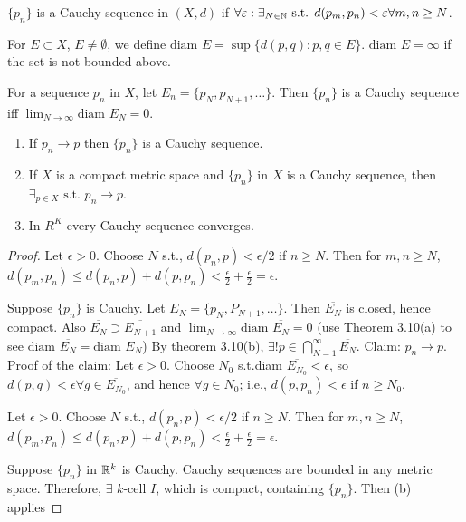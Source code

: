 \begin{definition}
	$\{p_n\}$ is a Cauchy sequence in $(X,d)$ if $\forall{\varepsilon}: \exists_{N \in \mathbb{N}} \text{ s.t. } d(p_{m},p_{n})<\varepsilon \forall m,n\ge N$.
\end{definition}
\begin{definition}
	\label{def:3.9}
	For $E \subset X$, $E \neq \emptyset$, we define $\text{diam } E=\sup{\{d(p,q): p,q \in E\}}$. $\text{diam } E=\infty$ if the set is not bounded above.
	\begin{example}
		For a sequence ${p_{n}}$ in $X$, let $E_{n}=\{p_N,p_{N+1},\ldots \}$. Then $\{p_{n}\}$ is a Cauchy sequence iff $\lim_{N\to \infty }{\text{diam }E_N}=0$.
	\end{example}

\end{definition}
\begin{thm}[11]
	\begin{enumerate}
		\item
		      \label{thm:3.11a}
		      If $p_{n}\to p$ then $\{p_{n}\} $ is a Cauchy sequence.
		\item If $X$ is a compact metric space and $\{p_{n}\}$ in $X$ is a Cauchy sequence, then $\exists_{p \in  X} \text{ s.t. } p_{n}\to p$.
		\item In $R^{K}$ every Cauchy sequence converges.
	\end{enumerate}
	\hfill
	\begin{proof}
		\item
		Let $\epsilon>0$. Choose $N$ s.t., $d(p_{n},p)<\epsilon/2$ if $n\ge N$. Then for $m,n\ge N$, $d(p_m,p_{n})\le d(p_{n},p)+d(p,p_n)<\frac{\epsilon}{2}+\frac{\epsilon}{2}=\epsilon$.
		\item
		Suppose $\{p_n\} $ is Cauchy. Let $E_{N}=\{p_{N},P_{N+1},\ldots \} $. Then $\overline{E_{N}}$ is closed, hence compact.
		Also $\overline{E_{N}} \supset \overline{E_{N+1}}$ and $\lim_{N\to \infty }{\text{diam }\overline{E_N}}=0$ (use Theorem 3.10(a) to see $\text{diam }\overline{E_N}=\text{diam }E_N $)
		By theorem 3.10(b), $\exists! {p \in \bigcap_{N=1}^{\infty } \overline{E_N}}$. Claim: $p_{n}\to p$.\\
		Proof of the claim: Let $\epsilon>0$. Choose $N_0$ s.t.diam $\overline{E_{N_0}}<\epsilon $, so $d(p,q)<\epsilon \forall g \in \overline{E_{N_0}}$, and hence $\forall{g \in N_0}$; i.e., $d(p,p_{n})<\epsilon$ if $n\ge N_0$.

		Let $\epsilon>0$. Choose $N$ s.t., $d(p_{n},p)<\epsilon/2$ if $n\ge N$. Then for $m,n\ge N$, $d(p_m,p_{n})\le d(p_{n},p)+d(p,p_n)<\frac{\epsilon}{2}+\frac{\epsilon}{2}=\epsilon$.
		\item Suppose $\{p_{n}\} $ in $\mathbb{R}^{k}$ is Cauchy. Cauchy sequences are bounded in any metric space. Therefore, $\exists$ $k$-cell $I$, which is compact, containing $\{p_{n}\}$. Then (b) applies
	\end{proof}

\end{thm}
